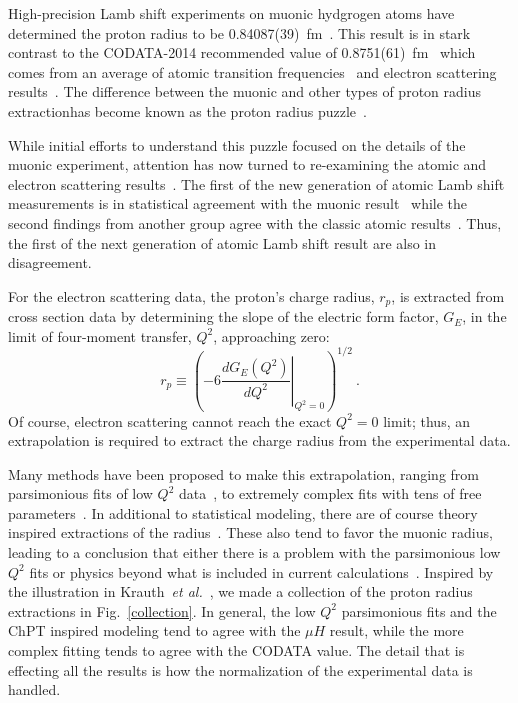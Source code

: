 \documentclass[10pt,aps,prc,twocolumn]{revtex4-1}
\begin{document}
High-precision Lamb shift experiments on muonic hydgrogen atoms have determined the proton radius to 
be 0.84087(39)~fm~\cite{Pohl:2010zza,Antognini:1900ns}.   This result is in stark contrast to the
CODATA-2014 recommended value of 0.8751(61)~fm~\cite{Mohr:2015ccw} which comes from an average of atomic 
transition frequencies~\cite{Boshier:1989zz,Weitz:1994zz,Berkeland:1995dyd,Bourzeix:1996zz,Udem:1997zz} and electron scattering results~\cite{Mohr:2012tt,Arrington:2015ria}.    The difference between the muonic and other types of 
proton radius extractionhas become known as the proton radius puzzle~\cite{Pohl:2013yb,Carlson:2015jba,Gao:2015aax,Pohl:2016tqq,Nez:2011zz}.

While initial efforts to understand this puzzle focused on the details of the muonic experiment, attention has
now turned to re-examining the atomic and electron scattering results~\cite{Kelkar:2016tcx}.   The first of the
new generation of atomic Lamb shift measurements is in statistical agreement with the muonic 
result~\cite{Beyer79} while the second findings from another group agree with the classic atomic 
results~\cite{fleurbaey:tel-01633631,Fleurbaey:2018}.   Thus, the first of the next generation of
atomic Lamb shift result are also in disagreement.

For the electron scattering data, the proton's charge radius, $r_p$, is extracted from
cross section data by determining the slope of the electric form factor, $G_E$, in the
limit of four-moment transfer, $Q^2$, approaching zero: 
\begin{equation}
\label{eq:radius}
  r_p \equiv %
    \left( -6  \left. \frac{dG_E(Q^2)}{dQ^2}
    \right|_{Q^{2}=0} \right)^{1/2} \>.
\end{equation}
Of course, electron scattering cannot reach the exact $Q^2 = 0$ limit; thus,
an extrapolation is required to extract the charge radius from the experimental data.

Many methods have been proposed to make this extrapolation,
ranging from parsimonious fits of low $Q^2$ data~\cite{Rosenfelder:1999cd,Griffioen:2015hta,Horbatsch:2015qda,Higinbotham:2015rja},
to extremely complex fits with tens of free parameters~\cite{Bernauer:2010wm,Bernauer:2013tpr,Lee:2015jqa,Graczyk:2014lba,Lorenz:2014vha}.
In additional to statistical modeling, there are of course 
theory inspired extractions of the radius~\cite{Belushkin:2006qa,Horbatsch:2016ilr}.   These also tend to favor the 
muonic radius, leading to a conclusion that either there is a problem with the parsimonious low $Q^2$ fits or physics beyond
what is included in current calculations~\cite{Carlson:2015jba,Liu:2016qwd}.
Inspired by the illustration in Krauth~{\it{et al.}}~\cite{Krauth:2017ijq}, we made a collection
of the proton radius extractions in Fig.~\ref{collection}.    In general, the low $Q^2$ parsimonious fits
and the ChPT inspired modeling tend to agree with the $\mu H$ result, while the more complex fitting
tends to agree with the CODATA value.   The detail that is effecting all the results is how the normalization
of the experimental data is handled.
\end{document}
